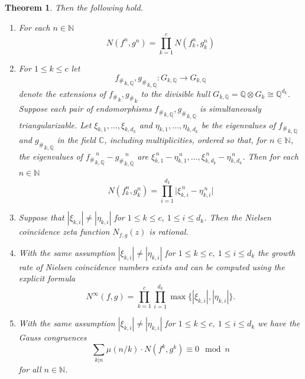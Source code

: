 \documentclass[12pt, a4paper]{amsart}
\def\C{{\mathbb C}}
\def\Q{{\mathbb Q}}
\newtheorem{theorem}{Theorem}
\def\N{{\mathbb N}}
\begin{document}
\begin{theorem}
  Then the following hold.
  \begin{enumerate}
    \item[(i)] For each $n \in \N$
      \begin{equation}\label{eq:nielsen-romankov}
        N(f^n, g^n) = \prod_{k=1}^c N(f_k^n, g_k^n)
      \end{equation}
    \item[(ii)] For $1 \leq k \leq c$ let
      \[
        {f_\#}_{k,\Q}, {g_\#}_{k,\Q}: G_{k,\Q} \to G_{k,\Q}
      \]
      denote the extensions of ${f_\#}_k, {g_\#}_k$ to the divisible hull
      $G_{k,\Q} = \Q \otimes G_k \cong \Q^{d_k}$.
      Suppose each pair of endomorphisms ${f_\#}_{k,\Q}, {g_\#}_{k,\Q}$ is simultaneously triangularizable.
      Let $\xi_{k,1}, \ldots, \xi_{k,d_k}$ and
      $\eta_{k,1}, \ldots, \eta_{k,d_k}$ be the eigenvalues of
      ${f_\#}_{k,\Q}$ and ${g_\#}_{k,\Q}$ in the field $\C$, including
      multiplicities, ordered so that, for $n \in \mathbb{N}$, the
      eigenvalues of ${f_\#}_{k,\Q}^{\, n} - {g_\#}_{k,\Q}^{\, n}$ are
      $\xi_{k,1}^{\, n} - \eta_{k,1}^{\, n}, \ldots, \xi_{k,d_k}^{\, n} - \eta_{k,d_k}^{\,n}$.
      Then for each $n \in \mathbb{N}$
       \begin{equation} \label{eq:nielsen-product-of-eigenvalues}
         N(f_k^n,g_k^n)
         = \prod_{i=1}^{d_k }\lvert \xi_{k,i}^{\, n} - \eta_{k,i}^{\, n} \rvert
       \end{equation}
     \item[(iii)] Suppose that $|\xi_{k,i}| \neq |\eta_{k,i}|$
       for $1 \leq k \leq c, \ 1 \leq i \leq d_k$.
       Then the Nielsen coincidence zeta function $N_{f,g}(z)$ is rational.
     \item[(iv)] With the same assumption $|\xi_{k,i}| \neq |\eta_{k,i}|$ for $1 \leq k \leq c, \ 1 \leq i \leq d_k$
       the growth rate of Nielsen coincidence numbers exists and can be computed using the explicit formula
       \begin{equation}\label{eq:nielsen-growth-formula}
         N^\infty(f,g) =
         \prod_{k=1}^c \prod_{i=1}^{d_k} \max\{|\xi_{k,i}|, |\eta_{k,i}|\}.
       \end{equation}
     \item[(v)] With the same assumption $|\xi_{k,i}| \neq |\eta_{k,i}|$ for $1 \leq k \leq c, \ 1 \leq i \leq d_k$
       we have the Gauss congruences
       \begin{equation}\label{eq:nielsen-gauss-congruences}
         \sum_{k|n} \mu(n/k)\cdot N(f^k, g^k) \equiv 0 \mod n
       \end{equation}
       for all $n \in \N$.
  \end{enumerate}
\end{theorem}
\end{document}
